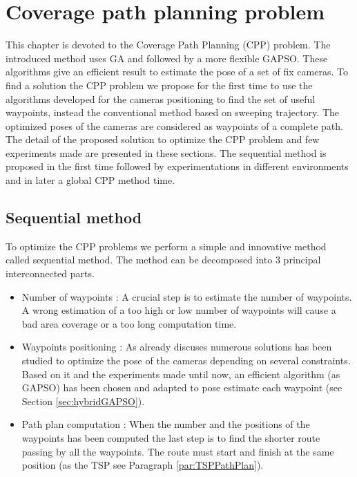 \chapter{Coverage path planning problem} 


\minitoc

This chapter is devoted to the Coverage Path Planning (CPP) problem. %
The introduced method uses GA and followed by a more flexible GAPSO. These algorithms give an efficient result to estimate the pose of a set of fix cameras. To find a solution the CPP problem we propose for the first time to use the algorithms developed for the cameras positioning to find the set of useful waypoints, instead the conventional method based on sweeping trajectory. The optimized poses of the cameras are considered as waypoints of a complete path. 
The detail of the proposed solution to optimize the CPP problem and few experiments made are presented in these sections. The sequential method is proposed in the first time followed by experimentations in different environments and in later a global CPP  method time.
 

\section{Sequential method} \label{sec:CPPsequantielMethod}
To optimize the CPP problems we perform a simple and innovative method called sequential method. The method can be decomposed into 3 principal interconnected parts. 
\begin{itemize}
	\item Number of waypoints : 
	A crucial step is to estimate the number of waypoints. A wrong estimation of a too high or low  number of waypoints will cause a bad area coverage or a too long computation time.
	\item Waypoints positioning : 
	As already discuses numerous solutions has been studied to optimize the pose of the cameras depending on several constraints. Based on it and the experiments made until now, an efficient algorithm (as GAPSO) has been chosen and adapted to pose estimate each waypoint (see Section  \ref{sec:hybridGAPSO}). 
	\item  Path plan computation : 
	 When the number and the positions of the waypoints has been computed the last step is to find the shorter route  passing by all the waypoints. The route must start and finish at the same position (as the TSP see Paragraph \ref{par:TSPPathPlan}).
	
\end{itemize}

